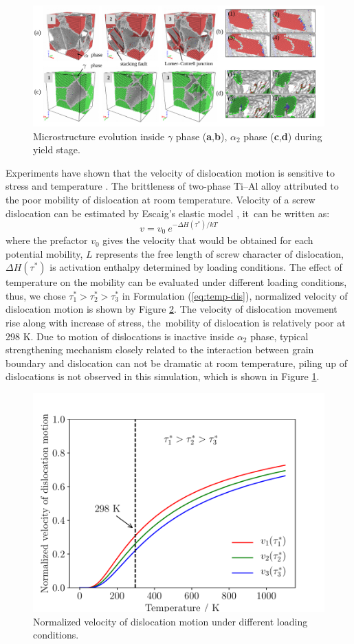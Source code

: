 \documentclass[materials,article,accept,moreauthors,pdftex,10pt,a4paper]{Definitions/mdpi}
\begin{document}
\begin{figure}[H]
\centering
\includegraphics[width=1\linewidth]{img/def-box}
\caption{Microstructure evolution inside $\gamma$ phase (\textbf{a},\textbf{b}), $\alpha_2$ phase (\textbf{c},\textbf{d}) during yield stage.}
\label{fig:Defect}
\end{figure}
Experiments have shown that the velocity of dislocation motion is sensitive to stress and temperature \cite{Stein1960}. The brittleness of two-phase Ti--Al alloy attributed to the poor mobility of dislocation at room temperature. Velocity of a screw dislocation can be estimated by Escaig's elastic model \cite{Escaig1968}, it~can be written as:
\begin{equation}\label{eq:temp-dis}
v = v_0\ e^{-\Delta H(\tau^*)/kT}
\end{equation}
where the prefactor $v_0$ gives the velocity that would be obtained for each potential mobility, $L$ represents the free length of screw character of dislocation, $\Delta H(\tau^*)$ is activation enthalpy determined by loading conditions. The effect of temperature on the mobility can be evaluated under different loading conditions, thus, we chose  $\tau_1^*>\tau_2^*>\tau_3^*$ in Formulation (\ref{eq:temp-dis}), normalized velocity of dislocation motion is shown by Figure  \ref{fig:temp}. The  velocity  of dislocation movement rise along with increase of  stress, the~mobility  of dislocation is relatively poor at 298 K. Due to motion of dislocations is inactive inside $\alpha_2$ phase,  typical strengthening mechanism closely related to the interaction between grain boundary and dislocation can not be dramatic at room temperature, piling up of dislocations is not observed in this simulation, which is shown in Figure \ref{fig:Defect}.
\begin{figure}[H]
\centering
\includegraphics[width=0.5\linewidth]{img/temp}
\caption{Normalized velocity of dislocation motion under different loading conditions.}
\label{fig:temp}
\end{figure}
\end{document}
